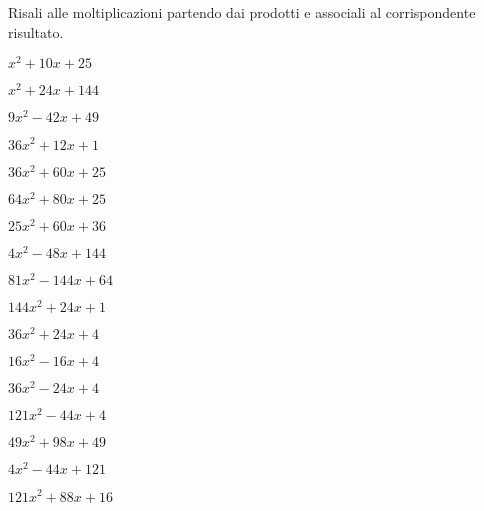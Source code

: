 \begin{esercizio}
\label{ese:11.11}
Risali alle moltiplicazioni partendo dai prodotti e associali al 
corrispondente risultato.

\begin{htmulticols}{3}
\begin{enumeratea}
\spazielenx
\item \(x^{2} + 10 x + 25\) %
\item \(x^{2} + 24 x + 144\) %
\item \(9 x^{2} - 42 x + 49\) %
\item \(36 x^{2} + 12 x + 1\) %
\item \(36 x^{2} + 60 x + 25\) %
\item \(64 x^{2} + 80 x + 25\) %
\item \(25 x^{2} + 60 x + 36\) %
\item \(4 x^{2} - 48 x + 144\) %
\item \(81 x^{2} - 144 x + 64\) %
\item \(144 x^{2} + 24 x + 1\) %
\item \(36 x^{2} + 24 x + 4\) %
\item \(16 x^{2} - 16 x + 4\) %
\item \(36 x^{2} - 24 x + 4\) %
\item \(121 x^{2} - 44 x + 4\) %
\item \(49 x^{2} + 98 x + 49\) %
\item \(4 x^{2} - 44 x + 121\) %
\item \(121 x^{2} + 88 x + 16\) %

\end{enumeratea}
\end{htmulticols}
\end{esercizio}
